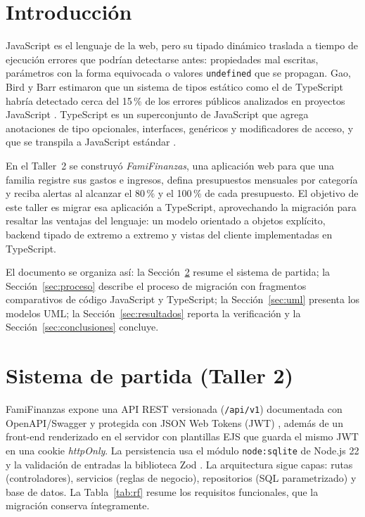 \documentclass[conference,a4paper]{IEEEtran}
\begin{document}
\section{Introducción}
JavaScript es el lenguaje de la web, pero su tipado dinámico traslada a tiempo de ejecución errores que podrían detectarse antes: propiedades mal escritas, parámetros con la forma equivocada o valores \texttt{undefined} que se propagan. Gao, Bird y Barr estimaron que un sistema de tipos estático como el de TypeScript habría detectado cerca del 15\,\% de los errores públicos analizados en proyectos JavaScript \cite{gao2017}. TypeScript es un superconjunto de JavaScript que agrega anotaciones de tipo opcionales, interfaces, genéricos y modificadores de acceso, y que se transpila a JavaScript estándar \cite{tshandbook,bierman2014}.

En el Taller~2 se construyó \emph{FamiFinanzas}, una aplicación web para que una familia registre sus gastos e ingresos, defina presupuestos mensuales por categoría y reciba alertas al alcanzar el 80\,\% y el 100\,\% de cada presupuesto. El objetivo de este taller es migrar esa aplicación a TypeScript, aprovechando la migración para resaltar las ventajas del lenguaje: un modelo orientado a objetos explícito, backend tipado de extremo a extremo y vistas del cliente implementadas en TypeScript.

El documento se organiza así: la Sección~\ref{sec:base} resume el sistema de partida; la Sección~\ref{sec:proceso} describe el proceso de migración con fragmentos comparativos de código JavaScript y TypeScript; la Sección~\ref{sec:uml} presenta los modelos UML; la Sección~\ref{sec:resultados} reporta la verificación y la Sección~\ref{sec:conclusiones} concluye.

\section{Sistema de partida (Taller 2)}\label{sec:base}
FamiFinanzas expone una API REST versionada (\texttt{/api/v1}) documentada con OpenAPI/Swagger y protegida con JSON Web Tokens (JWT) \cite{rfc7519}, además de un front-end renderizado en el servidor con plantillas EJS que guarda el mismo JWT en una cookie \emph{httpOnly}. La persistencia usa el módulo \texttt{node:sqlite} de Node.js 22 \cite{nodesqlite} y la validación de entradas la biblioteca Zod \cite{zod}. La arquitectura sigue capas: rutas (controladores), servicios (reglas de negocio), repositorios (SQL parametrizado) y base de datos. La Tabla~\ref{tab:rf} resume los requisitos funcionales, que la migración conserva íntegramente.
\end{document}
